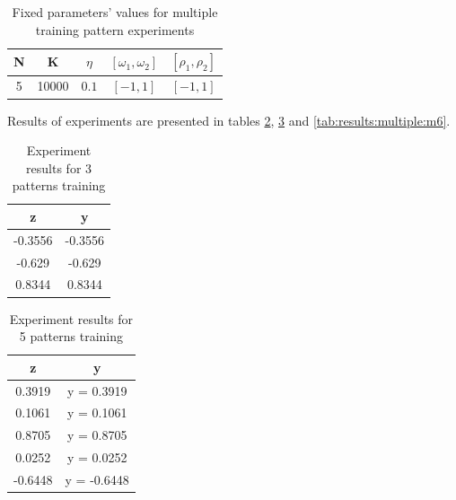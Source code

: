 \documentclass{classrep}
\begin{document}
{{            \begin{table}[!htbp]
                \centering
                \begin{tabular}{|c|c|c|c|c|}
                    \hline
                    N & K & $\eta$ & $[\omega_{1}, \omega_{2}]$ & $[\rho_{1},\rho_{2}]$ \\ \hline
                    5 & 10000 & $0.1$  & $[-1,1]$ & $[-1,1]$ \\ \hline
                \end{tabular}
                \caption{Fixed parameters' values for multiple training pattern
                experiments}
                \label{tab:results:multiple:params}
            \end{table}
            \FloatBarrier

            Results of experiments are presented in tables \ref{tab:results:multiple:m3},
            \ref{tab:results:multiple:m5} and \ref{tab:results:multiple:m6}.

            \begin{table}[!htbp]
                \centering
                \begin{tabular}{|c|c|}
                    \hline
                    z & y \\ \hline
                    -0.3556 & -0.3556 \\
                    -0.629 & -0.629 \\
                    0.8344 & 0.8344 \\ \hline
                \end{tabular}
                \caption{Experiment results for 3 patterns training}
                \label{tab:results:multiple:m3}
            \end{table}
            \FloatBarrier

            \begin{table}[!htbp]
                \centering
                \begin{tabular}{|c|c|}
                    \hline
                    z & y \\ \hline
                    0.3919 & y = 0.3919 \\
                    0.1061 & y = 0.1061 \\
                    0.8705 & y = 0.8705 \\
                    0.0252 & y = 0.0252 \\
                    -0.6448 & y = -0.6448 \\ \hline
                \end{tabular}
                \caption{Experiment results for 5 patterns training}
                \label{tab:results:multiple:m5}
            \end{table}
            \FloatBarrier

}}
\end{document}
